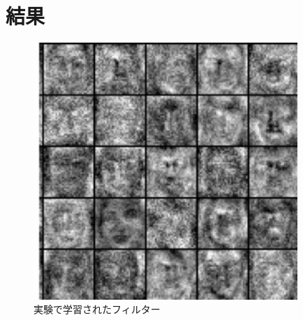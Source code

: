 \section{結果}

\begin{figure}[tbp]
 \begin{center}
  \includegraphics[width=100mm]{img/c6/filter}
 \end{center}
 \caption{実験で学習されたフィルター}
 \label{c6_filter}
\end{figure}